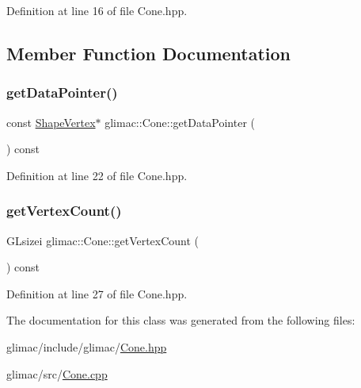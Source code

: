 Definition at line 16 of file Cone.\+hpp.



\subsection{Member Function Documentation}
\mbox{\label{classglimac_1_1_cone_a937d01989c21e55c5df5c298beab1285}} 
\subsubsection{\texorpdfstring{get\+Data\+Pointer()}{getDataPointer()}}
{\footnotesize\ttfamily const \hyperlink{structglimac_1_1_shape_vertex}{Shape\+Vertex}$\ast$ glimac\+::\+Cone\+::get\+Data\+Pointer (\begin{DoxyParamCaption}{ }\end{DoxyParamCaption}) const\hspace{0.3cm}{\ttfamily [inline]}}



Definition at line 22 of file Cone.\+hpp.

\mbox{\label{classglimac_1_1_cone_a7185ac37a58d1f4e176422c214cdcce5}} 
\subsubsection{\texorpdfstring{get\+Vertex\+Count()}{getVertexCount()}}
{\footnotesize\ttfamily G\+Lsizei glimac\+::\+Cone\+::get\+Vertex\+Count (\begin{DoxyParamCaption}{ }\end{DoxyParamCaption}) const\hspace{0.3cm}{\ttfamily [inline]}}



Definition at line 27 of file Cone.\+hpp.



The documentation for this class was generated from the following files\+:\begin{DoxyCompactItemize}
\item 
glimac/include/glimac/\hyperlink{_cone_8hpp}{Cone.\+hpp}\item 
glimac/src/\hyperlink{_cone_8cpp}{Cone.\+cpp}\end{DoxyCompactItemize}
